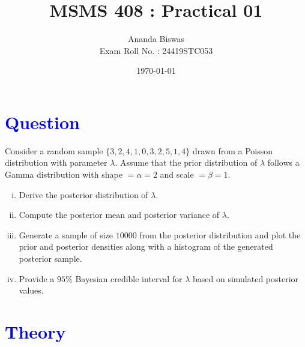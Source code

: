 \documentclass[11pt, a4paper]{article}\usepackage[]{graphicx}\usepackage[]{xcolor}
\title{MSMS 408 : Practical 01}
\author{Ananda Biswas \\[1em] Exam Roll No. : 24419STC053}
\date{\today}
\begin{document}
\maketitle


\section*{\faArrowAltCircleRight[regular] \textcolor{blue}{Question}}

\hspace{1cm} Consider a random sample $\{3, 2, 4, 1, 0, 3, 2, 5, 1, 4\}$ drawn from a Poisson distribution with parameter $\lambda$. Assume that the prior distribution of $\lambda$ follows a Gamma distribution with shape $ = \alpha = 2$ and scale $ = \beta = 1$.

\begin{enumerate}[(i)]
\item Derive the posterior distribution of $\lambda$.

\item Compute the posterior mean and posterior variance of $\lambda$.

\item Generate a sample of size $10000$ from the posterior distribution and plot the prior and posterior densities along with a histogram of the generated posterior sample.

\item Provide a $95\%$ Bayesian credible interval for $\lambda$ based on simulated posterior values.
\end{enumerate}

\section*{\faArrowAltCircleRight[regular] \textcolor{blue}{Theory}}
\end{document}
